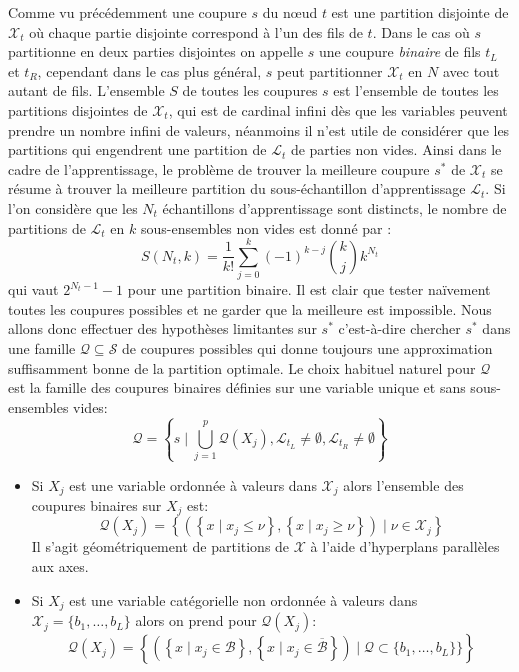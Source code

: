 Comme vu précédemment une coupure $s$ du nœud $t$ est une partition disjointe de $\mathcal{X}_t$ où chaque partie disjointe correspond à l'un des fils de $t$. Dans le cas où $s$ partitionne en deux parties disjointes on appelle $s$ une coupure \emph{binaire} de fils $t_L$ et $t_R$, cependant dans le cas plus général, $s$ peut partitionner $\mathcal{X}_t$ en $N$ avec tout autant de fils.
L'ensemble $S$ de toutes les coupures $s$ est l'ensemble de toutes les partitions disjointes de $\mathcal{X}_t$, qui est de cardinal infini dès que les variables peuvent prendre un nombre infini de valeurs, néanmoins il n'est utile de considérer que les partitions qui engendrent une partition de $\mathcal{L}_t$ de parties non vides. Ainsi dans le cadre de l'apprentissage, le problème de trouver la meilleure coupure $s^*$ de $\mathcal{X}_t$ se résume à trouver la meilleure partition du sous-échantillon d'apprentissage $\mathcal{L}_t$. Si l'on considère que les $N_t$ échantillons d'apprentissage sont distincts, le nombre de partitions de $\mathcal{L}_t$ en $k$ sous-ensembles non vides est donné par \citet{Knuth1992}:
\begin{equation*}
    S(N_t,k) = \frac{1}{k!} \sum_{j=0}^k (-1)^{k-j} \binom{k}{j} k^{N_t}
\end{equation*}
qui vaut $2^{N_t-1}-1$ pour une partition binaire. Il est clair que tester naïvement toutes les coupures possibles et ne garder que la meilleure est impossible. Nous allons donc effectuer des hypothèses limitantes sur $s^*$ c'est-à-dire chercher $s^*$ dans une famille $\mathcal{Q} \subseteq \mathcal{S}$ de coupures possibles qui donne toujours une approximation suffisamment bonne de la partition optimale.
Le choix habituel naturel pour $\mathcal{Q}$ est la famille des coupures binaires définies sur une variable unique et sans sous-ensembles vides:
\begin{equation*}
    \mathcal{Q} = \left\{ s \mid \bigcup_{j=1}^p \mathcal{Q}(X_j) , \mathcal{L}_{t_L} \neq \emptyset, \mathcal{L}_{t_R} \neq \emptyset \right\}
\end{equation*}
\begin{itemize}
    \item Si $X_j$ est une variable ordonnée à valeurs dans $\mathcal{X}_j$ alors l'ensemble des coupures binaires sur $X_j$ est: 
    \begin{equation*}
        \mathcal{Q}(X_j) = \left\{ \left( \left\{ x \mid x_j \leq \nu \right\},\left\{ x \mid x_j \geq \nu \right\} \right)  \mid \nu \in \mathcal{X}_j \right\}
    \end{equation*}
    Il s'agit géométriquement de partitions de $\mathcal{X}$ à l'aide d'hyperplans parallèles aux axes.
    \item Si $X_j$ est une variable catégorielle non ordonnée à valeurs dans $\mathcal{X}_j = \{b_1,\dotsc,b_L\}$\label{ntn:b_l} alors on prend pour $\mathcal{Q}(X_j)$:
    \begin{equation*}
        \mathcal{Q}(X_j) = \left\{ \left( \left\{ x \mid x_j \in \mathcal{B} \right\},\left\{ x \mid x_j \in \overline{\mathcal{B}} \right\} \right)  \mid \mathcal{Q} \subset \{ b_1,\dotsc,b_L \} \} \right\}
    \end{equation*}
\end{itemize}
